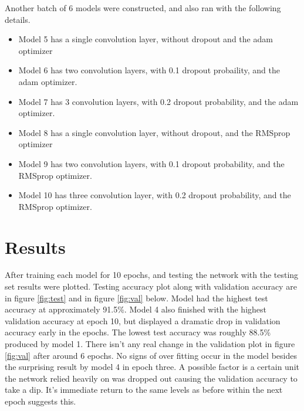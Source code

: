 \documentclass[twocolumn,letterpaper,10pt]{article}
\begin{document}
Another batch of 6 models were constructed, and also ran with the following details. 
\begin{itemize}
        \item Model 5 has a single convolution layer, without dropout and the adam optimizer
        \item Model 6 has two convolution layers, with 0.1 dropout probaility, and the adam optimizer. 
        \item Model 7 has 3 convolution layers, with 0.2 dropout probability, and the adam optimizer.
        \item Model 8 has a single convolution layer, without dropout, and the RMSprop optimizer
        \item Model 9 has two convolution layers, with 0.1 dropout probability, and the RMSprop optimizer.
        \item Model 10 has three convolution layer, with 0.2 dropout probability, and the RMSprop optimizer.
\end{itemize}

\section{Results}
\label{results}
After training each model for 10 epochs, and testing the network with the testing set results were plotted. Testing accuracy plot along with validation accuracy are in figure \ref{fig:test} and in figure \ref{fig:val} below. Model  had the highest test accuracy at approximately 91.5\%. Model 4 also finished with the highest validation accuracy at epoch 10, but displayed a dramatic drop in validation accuracy early in the epochs. The lowest test accuracy was roughly 88.5\% produced by model 1. There isn't any real change in the validation plot in figure \ref{fig:val} after around 6 epochs. No signs of over fitting occur in the model besides the surprising result by model 4 in epoch three. A possible factor is a certain unit the network relied heavily on was dropped out causing the validation accuracy to take a dip. It's immediate return to the same levels as before within the next epoch suggests this. 
\end{document}
